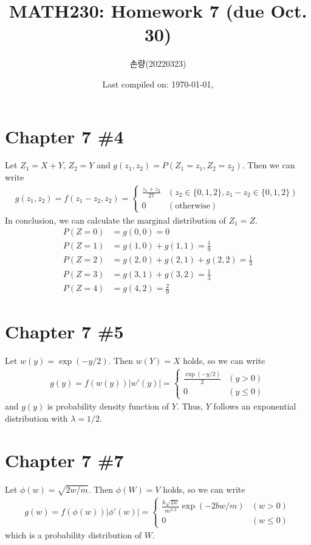 \documentclass{scrartcl}
\title{MATH230: Homework 7 (due Oct. 30)}
\author{손량(20220323)}
\date{Last compiled on: \today, \currenttime}
\begin{document}
\maketitle

\section{Chapter 7 \#4}
Let \(Z_1 = X + Y\), \(Z_2 = Y\) and \(g(z_1, z_2) = P(Z_1 = z_1, Z_2 = z_2)\).
Then we can write
\begin{align*}
  g(z_1, z_2)
  = f(z_1 - z_2, z_2)
  = \begin{cases}
    \frac{z_1 + z_2}{27} & (z_2 \in \{0, 1, 2\}, z_1 - z_2 \in \{0, 1, 2\}) \\
    0 & (\text{otherwise})
  \end{cases}
\end{align*}
In conclusion, we can calculate the marginal distribution of \(Z_1 = Z\).
\begin{align*}
  P(Z = 0)
  &= g(0, 0)
  = 0 \\
  P(Z = 1)
  &= g(1, 0) + g(1, 1)
  = \frac{1}{9} \\
  P(Z = 2)
  &= g(2, 0) + g(2, 1) + g(2, 2)
  = \frac{1}{3} \\
  P(Z = 3)
  &= g(3, 1) + g(3, 2)
  = \frac{1}{3} \\
  P(Z = 4)
  &= g(4, 2)
  = \frac{2}{9}
\end{align*}

\section{Chapter 7 \#5}
Let \(w(y) = \exp(-y / 2)\). Then \(w(Y) = X\) holds, so we can write
\begin{align*}
  g(y)
  = f(w(y)) |w'(y)|
  = \begin{cases}
    \frac{\exp(-y / 2)}{2} & (y > 0) \\
    0 & (y \le 0)
  \end{cases}
\end{align*}
and \(g(y)\) is probability density function of \(Y\). Thus, \(Y\) follows an
exponential distribution with \(\lambda = 1/2\).

\section{Chapter 7 \#7}
Let \(\phi(w) = \sqrt{2w / m}\). Then \(\phi(W) = V\) holds, so we can write
\begin{align*}
  g(w)
  = f(\phi(w)) |\phi'(w)|
  = \begin{cases}
    \frac{k \sqrt{2w}}{m^{3/2}} \exp(-2bw / m) & (w > 0) \\
    0 & (w \le 0)
  \end{cases}
\end{align*}
which is a probability distribution of \(W\).
\end{document}
